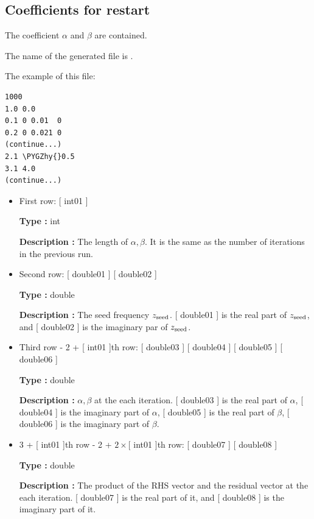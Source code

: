 \documentclass[letterpaper,10pt,dvipdfmx,openany]{sphinxmanual}
\def\PYGZhy{\char`\-}
\begin{document}
\subsection{Coefficients for restart}
\label{shiftk_format_en:recoeff}\label{shiftk_format_en:coefficients-for-restart}
The coefficient \(\alpha\) and \(\beta\)
are contained.

The name of the generated file is .

The example of this file:

\begin{Verbatim}[commandchars=\\\{\}]
1000
1.0 0.0
0.1 0 0.01  0
0.2 0 0.021 0
(continue...)
2.1 \PYGZhy{}0.5
3.1 4.0
(continue...)
\end{Verbatim}
\begin{itemize}
\item {} 
First row: {[} int01 {]}

\textbf{Type :} int

\textbf{Description :}
The length of \(\alpha, \beta\).
It is the same as the number of iterations in the previous run.

\item {} 
Second row: {[} double01 {]} {[} double02 {]}

\textbf{Type :} double

\textbf{Description :} The seed frequency \(z_{\rm seed}\).
{[} double01 {]} is the real part of \(z_{\rm seed}\), and
{[} double02 {]} is the imaginary par of \(z_{\rm seed}\).

\item {} 
Third row - 2 + {[} int01 {]}th row:
{[} double03 {]} {[} double04 {]} {[} double05 {]} {[} double06 {]}

\textbf{Type :} double

\textbf{Description :} \(\alpha, \beta\) at the each iteration.
{[} double03 {]} is the real part of \(\alpha\),
{[} double04 {]} is the imaginary part of \(\alpha\),
{[} double05 {]} is the real part of \(\beta\),
{[} double06 {]} is the imaginary part of \(\beta\).

\item {} 
3 + {[} int01 {]}th row -
2 + \(2\times[\) int01 {]}th row:
{[} double07 {]} {[} double08 {]}

\textbf{Type :} double

\textbf{Description :} The product of the RHS vector and
the residual vector at the each iteration.
{[} double07 {]} is the real part of it, and
{[} double08 {]} is the imaginary part of it.

\end{itemize}
\end{document}
